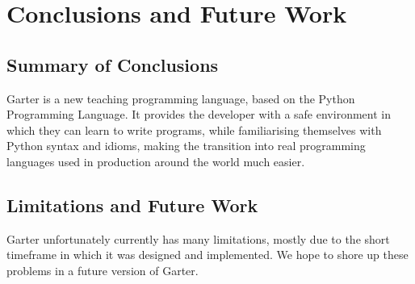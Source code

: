 \glsresetall %
\chapter{Conclusions and Future Work}\label{ch:Conclusion}

\section{Summary of Conclusions}

Garter is a new teaching programming language, based on the Python Programming
Language. It provides the developer with a safe environment in which they can
learn to write programs, while familiarising themselves with Python syntax and
idioms, making the transition into real programming languages used in production
around the world much easier.

\section{Limitations and Future Work}\label{sec:FutureWork}

Garter unfortunately currently has many limitations, mostly due to the short
timeframe in which it was designed and implemented. We hope to shore up these
problems in a future version of Garter.


